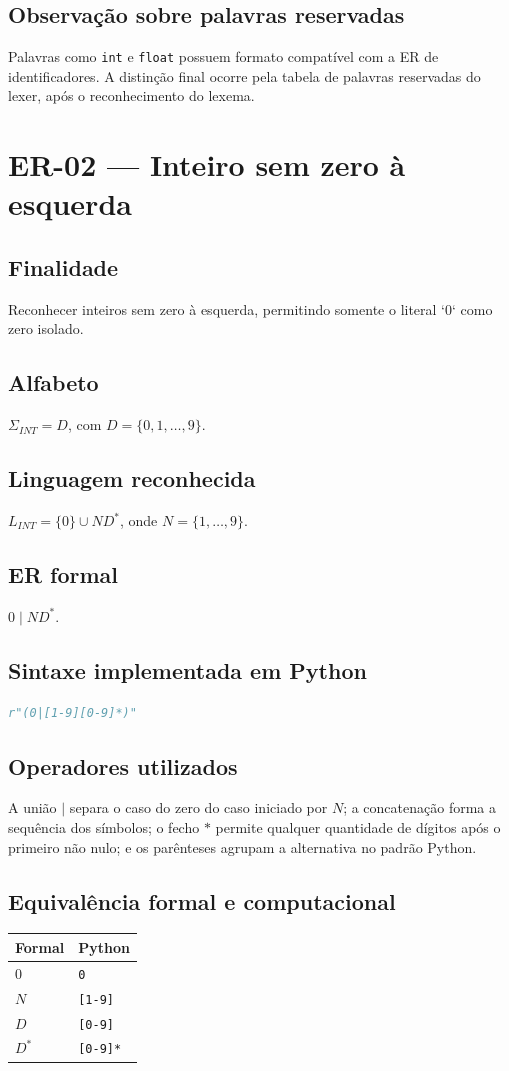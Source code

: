 \subsection{Observação sobre palavras reservadas}
Palavras como \texttt{int} e \texttt{float} possuem formato compatível com a ER de identificadores. A distinção final ocorre pela tabela de palavras reservadas do lexer, após o reconhecimento do lexema.

\section{ER-02 --- Inteiro sem zero à esquerda}
\subsection{Finalidade}
Reconhecer inteiros sem zero à esquerda, permitindo somente o literal `0` como zero isolado.
\subsection{Alfabeto}
$\Sigma_{INT}=D$, com $D=\{0,1,\ldots,9\}$.
\subsection{Linguagem reconhecida}
$L_{INT}=\{0\}\cup ND^*$, onde $N=\{1,\ldots,9\}$.
\subsection{ER formal}
$0\mid ND^*$.
\subsection{Sintaxe implementada em Python}
\begin{lstlisting}[language=Python]
r"(0|[1-9][0-9]*)"
\end{lstlisting}
\subsection{Operadores utilizados}
A união $\mid$ separa o caso do zero do caso iniciado por $N$; a concatenação forma a sequência dos símbolos; o fecho $*$ permite qualquer quantidade de dígitos após o primeiro não nulo; e os parênteses agrupam a alternativa no padrão Python.
\subsection{Equivalência formal e computacional}
\begin{center}
\small
\begin{tabular}{|p{}|p{}|}
\toprule
Formal & Python \\
\midrule
$0$ & \texttt{0} \\
$N$ & \texttt{[1-9]} \\
$D$ & \texttt{[0-9]} \\
$D^*$ & \texttt{[0-9]*} \\
\bottomrule
\end{tabular}
\end{center}
